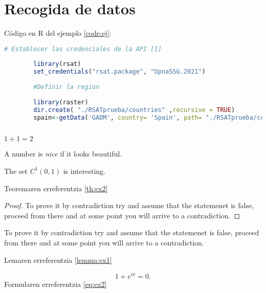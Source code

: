 \chapter[Recogida de datos]{Recogida de datos}
\label{Chap2}

Código en R del ejemplo \ref{code:ej}:
	\begin{lstlisting}[language=R, caption=pie de código,label=code:ej]
		# Establecer las credenciales de la API [1]
		
		library(rsat)
		set_credentials("rsat.package", "UpnaSSG.2021")
		
		#Definir la region
		
		library(raster)
		dir.create( "./RSATprueba/countries" ,recursive = TRUE)
		spain<-getData('GADM', country= 'Spain', path= "./RSATprueba/countries", level=2)
		
	\end{lstlisting}


\begin{theorem}[Sum]\label{th:ex1}
$1+1=2$
\end{theorem}

\begin{definition}\label{def:ex1}
A number is \emph{nice} if it looks beautiful.
\end{definition}

\begin{theorem}[About $C^{1}(0,1)$]\label{th:ex2}
The set $C^{1}(0,1)$ is interesting.
\end{theorem}
Teoremaren erreferentzia \ref{th:ex2}

\begin{proof}\label{pf:ex1}
To prove it by contradiction try and assume that the statemenet is false,
proceed from there and at some point you will arrive to a contradiction.
\end{proof}



\begin{lemma}\label{lemma:ex1}
To prove it by contradiction try and assume that the statemenet is false,
proceed from there and at some point you will arrive to a contradiction.
\end{lemma}

Lemaren erreferentzia \ref{lemma:ex1}


\begin{equation}\label{eq:ex2}
  1 + e^{i \pi} = 0.
\end{equation}
Formularen erreferentzia \ref{eq:ex2}